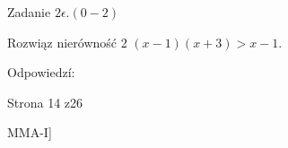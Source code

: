 \documentclass[a4paper,12pt]{article}
\begin{document}
Zadanie $2\epsilon. (0-2)$

Rozwiąz nierówność 2 $(x-1)(x+3)>x-1.$

Odpowiedzí:

Strona 14 z26

MMA-I]
\end{document}

